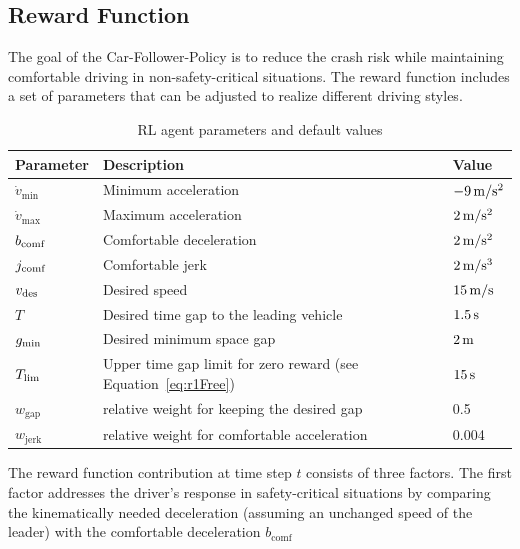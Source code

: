 \documentclass[review]{elsarticle}
\providecommand{\sub}[1]{_{\mathrm{#1}}}  %
\providecommand{\3}{{\ss}}
\begin{document}
	\subsection{Reward Function}
	\label{rewardFunctionFollow}
	The goal of the Car-Follower-Policy is to reduce the crash risk while
	maintaining comfortable driving in non-safety-critical situations. The
	reward function includes a set of parameters that can be
	adjusted to realize different driving styles. 
	
	\begin{table}
		\caption{RL agent parameters and default values} 
		\label{tab:agentParameters} 
		\begin{center}
			\begin{tabular}{ p{}| p{}| p{}}
				Parameter & Description & Value \\ \hline
				$\dot{v}\sub{min}$ & Minimum acceleration & $\unit[-9]{m/s^2}$ \\  
				$\dot{v}\sub{max}$ & Maximum acceleration & $\unit[2]{m/s^2}$ \\  
				$b_{\rm comf}$ & Comfortable deceleration & $\unit[2]{m/s^2}$ \\  
				$j_{\rm comf}$ & Comfortable jerk & $\unit[2]{m/s^3}$ \\  
				$v_{\rm des}$ & Desired speed & $\unit[15]{ m/s}$ \\  		
				$T$ & Desired time gap to the leading vehicle & $\unit[1.5]{s}$ \\
				$g_{\rm min}$ & Desired minimum space gap & $\unit[2]{m}$ \\
				$T_{\rm lim}$ & Upper time gap limit for zero reward (see
				Equation~\eqref{eq:r1Free}) & $\unit[15]{s}$ \\
				$w\sub{gap}$ & relative weight for keeping the desired gap & 0.5\\
				$w\sub{jerk}$ & relative weight for comfortable acceleration & 0.004\\
			\end{tabular}
		\end{center}
	\end{table}
	
	
	
	The reward function contribution at time step $t$ consists of three factors. 
	The first factor addresses the driver's
	response in safety-critical situations by comparing the
	kinematically needed deceleration (assuming an
	unchanged speed of the leader) with the
	comfortable deceleration $b\sub{comf}$	
	
\end{document}
